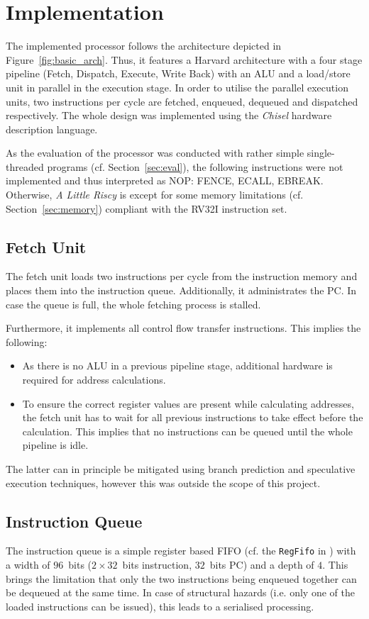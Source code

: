 \documentclass[conference]{IEEEtran}
\begin{document}
\section{Implementation} \label{sec:implementation}

The implemented processor follows the architecture depicted in Figure~\ref{fig:basic_arch}. Thus, it features a Harvard architecture with a four stage pipeline (Fetch, Dispatch, Execute, Write Back) with an ALU and a load/store unit in parallel in the execution stage. In order to utilise the parallel execution units, two instructions per cycle are fetched, enqueued, dequeued and dispatched respectively. The whole design was implemented using the \emph{Chisel} hardware description language.

As the evaluation of the processor was conducted with rather simple single-threaded programs (cf. Section~\ref{sec:eval}), the following instructions were not implemented and thus interpreted as NOP: FENCE, ECALL, EBREAK. Otherwise, \emph{A Little Riscy} is except for some memory limitations (cf. Section~\ref{sec:memory}) compliant with the RV32I instruction set.


\subsection{Fetch Unit}
The fetch unit loads two instructions per cycle from the instruction memory and places them into the instruction queue. Additionally, it administrates the PC. In case the queue is full, the whole fetching process is stalled.

Furthermore, it implements all control flow transfer instructions. This implies the following:
\begin{itemize}
	\item As there is no ALU in a previous pipeline stage, additional hardware is required for address calculations.
	\item To ensure the correct register values are present while calculating addresses, the fetch unit has to wait for all previous instructions to take effect before the calculation. This implies that no instructions can be queued until the whole pipeline is idle.
\end{itemize}

The latter can in principle be mitigated using branch prediction and speculative execution techniques, however this was outside the scope of this project.

\subsection{Instruction Queue}
The instruction queue is a simple register based FIFO (cf. the \verb|RegFifo| in \cite{schoeberl}) with a width of $96$~bits ($2\times32$~bits instruction, $32$~bits PC) and a depth of $4$. This brings the limitation that only the two instructions being enqueued together can be dequeued at the same time. In case of structural hazards (i.e. only one of the loaded instructions can be issued), this leads to a serialised processing.
\end{document}
